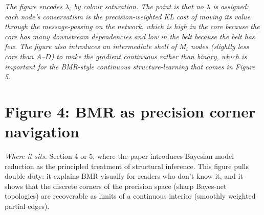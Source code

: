 \documentclass[11pt]{article}
\begin{document}
\begin{center}
\end{center}

\noindent\textit{\textcolor{notegrey}{The figure encodes $\lambda_i$ by colour saturation. The point is that no $\lambda$ is assigned: each node's conservatism is the precision-weighted KL cost of moving its value through the message-passing on the network, which is high in the core because the core has many downstream dependencies and low in the belt because the belt has few. The figure also introduces an intermediate shell of $M_i$ nodes (slightly less core than $A$--$D$) to make the gradient continuous rather than binary, which is important for the BMR-style continuous structure-learning that comes in Figure 5.}}

\newpage
\section*{Figure 4: BMR as precision corner navigation}

\textit{Where it sits.} Section 4 or 5, where the paper introduces Bayesian model reduction as the principled treatment of structural inference. This figure pulls double duty: it explains BMR visually for readers who don't know it, and it shows that the discrete corners of the precision space (sharp Bayes-net topologies) are recoverable as limits of a continuous interior (smoothly weighted partial edges).
\end{document}
